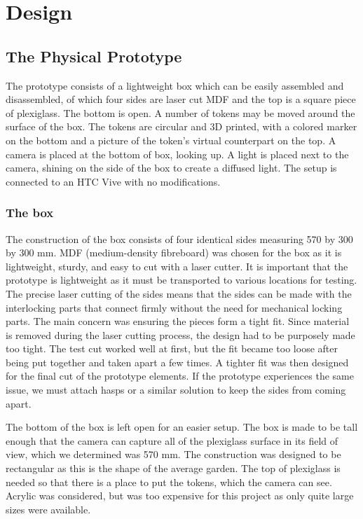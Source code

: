 \chapter{Design}

\section{The Physical Prototype}

The prototype consists of a lightweight box which can be easily assembled and disassembled, of which four sides are laser cut MDF and the top is a square piece of plexiglass. The bottom is open. A number of tokens may be moved around the surface of the box. The tokens are circular and 3D printed, with a colored marker on the bottom and a picture of the token's virtual counterpart on the top. A camera is placed at the bottom of box, looking up. A light is placed next to the camera, shining on the side of the box to create a diffused light. 
The setup is connected to an HTC Vive with no modifications.

\subsection{The box}

The construction of the box consists of four identical sides measuring 570 by 300 by 300 mm. MDF (medium-density fibreboard) was chosen for the box as it is lightweight, sturdy, and easy to cut with a laser cutter. It is important that the prototype is lightweight as it must be transported to various locations for testing. The precise laser cutting of the sides means that the sides can be made with the interlocking parts that connect firmly without the need for mechanical locking parts. The main concern was ensuring the pieces form a tight fit. Since material is removed during the laser cutting process, the design had to be purposely made too tight. The test cut worked well at first, but the fit became too loose after being put together and taken apart a few times. A tighter fit was then designed for the final cut of the prototype elements. If the prototype experiences the same issue, we must attach hasps or a similar solution to keep the sides from coming apart. 

The bottom of the box is left open for an easier setup.
The box is made to be tall enough that the camera can capture all of the plexiglass surface in its field of view, which we determined was 570 mm.
The construction was designed to be rectangular as this is the shape of the average garden. %
The top of plexiglass is needed so that there is a place to put the tokens, which the camera can see. Acrylic was considered, but was too expensive for this project as only quite large sizes were available.

